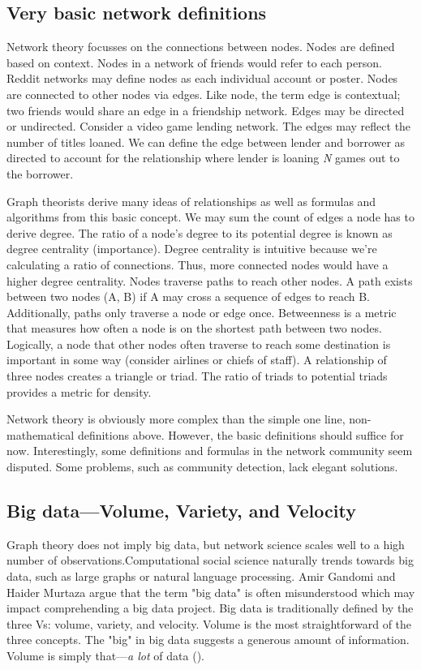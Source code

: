 \documentclass[12pt, a4paper]{article}
\begin{document}
\subsection{Very basic network definitions}
Network theory focusses on the connections between nodes. Nodes are defined based on context. Nodes in a network of friends would refer to each person. Reddit networks may define nodes as each individual account or poster. Nodes are connected to other nodes via edges. Like node, the term edge is contextual; two friends would share an edge in a friendship network. Edges may be directed or undirected. Consider a video game lending network. The edges may reflect the number of titles loaned. We can define the edge between lender and borrower as directed to account for the relationship where lender is loaning \textit{N} games out to the borrower.

Graph theorists derive many ideas of relationships as well as formulas and algorithms from this basic concept. We may sum the count of edges a node has to derive degree. The ratio of a node's degree to its potential degree is known as degree centrality (importance). Degree centrality is intuitive because we're calculating a ratio of connections. Thus, more connected nodes would have a higher degree centrality. Nodes traverse paths to reach other nodes. A path exists between two nodes (A, B) if A may cross a sequence of edges to reach B. Additionally, paths only traverse a node or edge once. Betweenness is a metric that measures how often a node is on the shortest path between two nodes. Logically, a node that other nodes often traverse to reach some destination is important in some way (consider airlines or chiefs of staff). A relationship of three nodes creates a triangle or triad. The ratio of triads to potential triads provides a metric for density.

Network theory is obviously more complex than the simple one line, non-mathematical definitions above. However, the basic definitions should suffice for now. Interestingly, some definitions and formulas in the network community seem disputed. Some problems, such as community detection, lack elegant solutions.

\subsection{Big data---Volume, Variety, and Velocity}
Graph theory does not imply big data, but network science scales well to a high number of observations.Computational social science naturally trends towards big data, such as large graphs or natural language processing. Amir Gandomi and Haider Murtaza argue that the term "big data" is often misunderstood which may impact comprehending a big data project. Big data is traditionally defined by the three Vs: volume, variety, and velocity. Volume is the most straightforward of the three concepts. The "big" in big data suggests a generous amount of information. Volume is simply that---\textit{a lot} of data (\cite{gandomiamir2015}).
\end{document}
